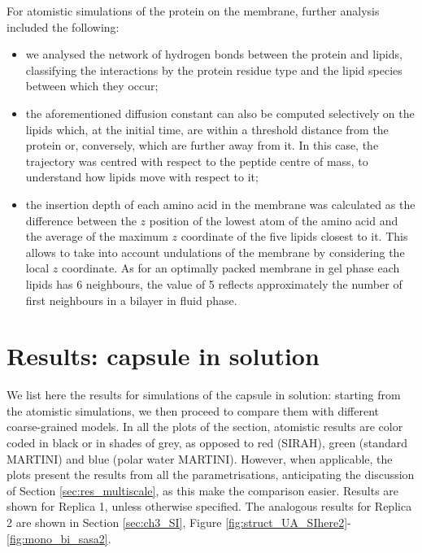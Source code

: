 For atomistic simulations of the protein on the membrane, further analysis included the following:
\begin{itemize}
\item we analysed the network of hydrogen bonds between the protein and lipids, classifying the interactions by the protein residue type and the lipid species between which they occur;
\item the aforementioned diffusion constant can also be computed selectively on the lipids which, at the initial time, are within a threshold distance from the protein or, conversely, which are further away from it. In this case, the trajectory was centred with respect to the peptide centre of mass, to understand how lipids move with respect to it;
\item the insertion depth of each amino acid in the membrane was calculated as the difference between the $z$ position of the lowest atom of the amino acid and the average of the maximum $z$ coordinate of the five lipids closest to it. This allows to take into account undulations of the membrane by considering the local $z$ coordinate. As for an optimally packed membrane in gel phase each lipids has 6 neighbours, the value of 5 reflects approximately the number of first neighbours in a bilayer in fluid phase.
\end{itemize}

\section{Results: capsule in solution} \label{sec:results_cap}
We list here the results for simulations of the capsule in solution: starting from the atomistic simulations, we then proceed to compare them with different coarse-grained models. In all the plots of the section, atomistic results are color coded in black or in shades of grey, as opposed to red (SIRAH), green (standard MARTINI) and blue (polar water MARTINI). However, when applicable, the plots present the results from all the parametrisations, anticipating the discussion of Section \ref{sec:res_multiscale}, as this make the comparison easier. Results are shown for Replica 1, unless otherwise specified. The analogous results for Replica 2 are shown in Section \ref{sec:ch3_SI}, Figure \ref{fig:struct_UA_SIhere2}-\ref{fig:mono_bi_sasa2}.

